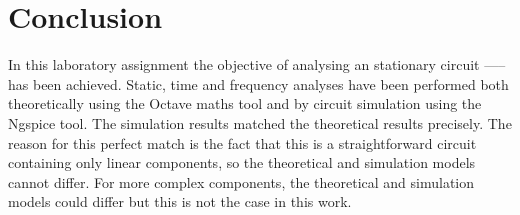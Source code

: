 \section{Conclusion}
\label{sec:conclusion}

In this laboratory assignment the objective of analysing an stationary circuit ----- has been
achieved. Static, time and frequency analyses have been performed both
theoretically using the Octave maths tool and by circuit simulation using the
Ngspice tool. The simulation results matched the theoretical results
precisely. The reason for this perfect match is the fact that this is a
straightforward circuit containing only linear components, so the theoretical
and simulation models cannot differ. For more complex components, the
theoretical and simulation models could differ but this is not the case in this
work.



